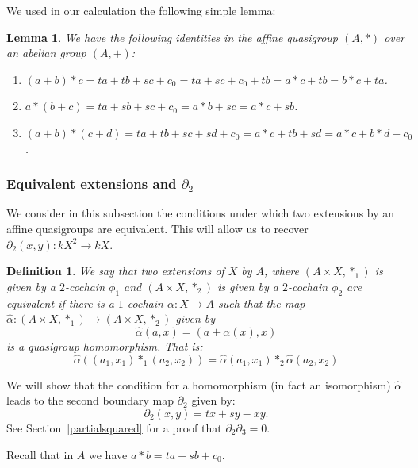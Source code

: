 \documentclass[10pt,a4paper]{amsart}
\newtheorem{lemma}[theorem]{Lemma}
\newtheorem{definition}[theorem]{Definition}
\theoremstyle{definition}
\begin{document}
\setcounter{section}{3}\setcounter{subsection}{1}\setcounter{subsubsection}{0}\setcounter{theorem}{1}
We used in our calculation the following simple lemma:
\begin{lemma}\label{lem:32}
We have the following identities in the affine quasigroup $(A,\ast)$ over an abelian group $(A,+)$:
\begin{enumerate}
\item[(1)] $(a+b)*c= ta+tb+sc+c_0= ta+sc+c_0 + tb= a*c+tb= b*c+ ta$.
\item[(2)] $ a*(b+c)= ta+sb +sc+ c_0= a*b+sc= a*c+sb$.
\item[(3)] $ (a+b)*(c+d)= ta+tb +sc+ sd+ c_0= a*c+tb+sd=a*c+b*d-c_0$.
\end{enumerate}
\end{lemma}

\setcounter{theorem}{2}\setcounter{subsubsection}{2}
\subsubsection{Equivalent extensions and $\partial_2$} 

We consider in this subsection the conditions under  which two extensions by an affine quasigroups are equivalent. This will allow us to recover $\partial_2(x,y): kX^2\to kX$.
\begin{definition} 
We say that two extensions of $X$ by $A$, where $(A\times X,*_1)$ is given by a $2$-cochain $\phi_1$ and $(A\times X,*_2)$ is given by a $2$-cochain  $\phi_2$ are equivalent if there is a $1$-cochain $\alpha: X \to A$ such that the map 
$\hat\alpha: (A\times X,*_1)\to (A\times X,*_2)$ given by 
$$\hat\alpha(a,x)= (a+\alpha(x),x)$$
is a quasigroup homomorphism. That is:
$$\hat\alpha((a_1,x_1)*_1(a_2,x_2))=\hat\alpha(a_1,x_1)*_2\hat\alpha(a_2,x_2)$$
\end{definition}
We will show that the condition for a homomorphism (in fact an isomorphism) $\hat\alpha$ leads to the second boundary map $\partial_2$ given by:
$$\partial_2(x,y)= tx + sy - xy.$$
See Section~\ref{partialsquared} for a proof that $\partial_2 \partial_3 = 0$. 

Recall that in $A$ we have $a*b= ta+sb+c_0.$
\end{document}
